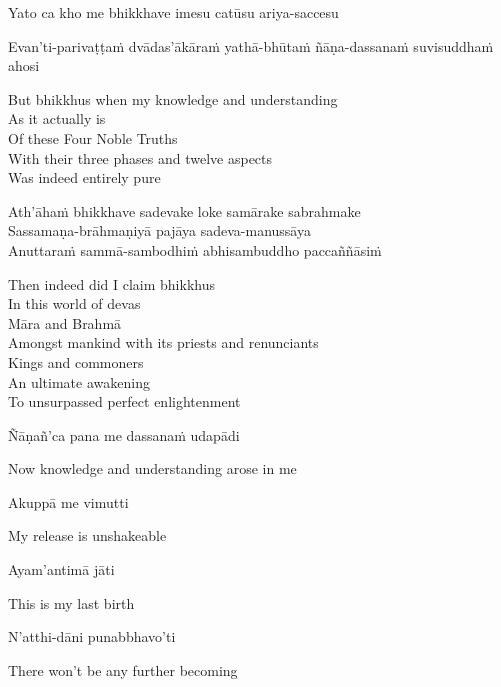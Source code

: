 Yato ca kho me bhikkhave imesu catūsu ariya-saccesu
\begin{pali-hangtogether}
  Evan'ti-parivaṭṭaṁ dvādas'ākāraṁ yathā-bhūtaṁ ñāṇa-dassanaṁ suvisuddhaṁ ahosi
\end{pali-hangtogether}

\begin{english-verses}
  But bhikkhus when my knowledge and understanding\\
  As it actually is\\
  Of these Four Noble Truths\\
  With their three phases and twelve aspects\\
  Was indeed entirely pure
\end{english-verses}

Ath'āhaṁ bhikkhave sadevake loke samārake sabrahmake\\
Sassamaṇa-brāhmaṇiyā pajāya sadeva-manussāya\\
Anuttaraṁ sammā-sambodhiṁ abhisambuddho paccaññāsiṁ

\begin{english-verses}
  Then indeed did I claim bhikkhus\\
  In this world of devas\\
  Māra and Brahmā\\
  Amongst mankind with its priests and renunciants\\
  Kings and commoners\\
  An ultimate awakening\\
  To unsurpassed perfect enlightenment
\end{english-verses}

Ñāṇañ'ca pana me dassanaṁ udapādi

\begin{english}
  Now knowledge and understanding arose in me
\end{english}

Akuppā me vimutti

\begin{english}
  My release is unshakeable
\end{english}

Ayam'antimā jāti

\begin{english}
  This is my last birth
\end{english}

N'atthi-dāni punabbhavo'ti

\begin{english}
  There won't be any further becoming
\end{english}

